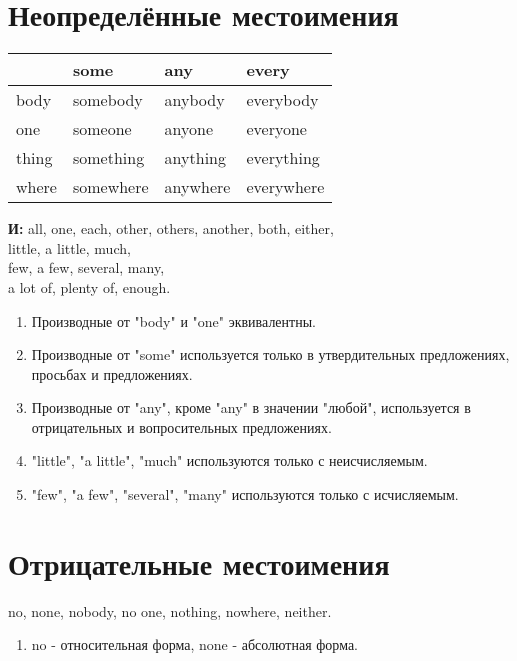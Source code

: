 \documentclass[oneside]{book}
\begin{document}
	\section{Неопределённые местоимения}
	\begin{center}
		\begin{tabular}{|l|l|l|l|}
		\hline
			  & some      & any      & every      \\ \hline
		body  & somebody  & anybody  & everybody  \\ \hline
		one   & someone   & anyone   & everyone   \\ \hline
		thing & something & anything & everything \\ \hline
		where & somewhere & anywhere & everywhere \\ \hline
		\end{tabular}
	\end{center}

	\textbf{И:} all, one, each, other, others, another,
	both, either,
	\\
	little, a little, much,
	\\
	few, a few, several, many,
	\\
	a lot of, plenty of, enough.

	\begin{enumerate}
		\item Производные от "body" и "one" эквивалентны.

		\item Производные от "some" используется только в
		утвердительных предложениях, просьбах и предложениях.

		\item Производные от "any"{}, кроме "any" в значении
		"любой"{}, используется в отрицательных
		и вопросительных предложениях.

		\item "little"{}, "a little"{}, "much" используются только
		с неисчисляемым.

		\item "few"{}, "a few"{}, "several"{}, "many" используются
		только с исчисляемым.
	\end{enumerate}

	\section{Отрицательные местоимения}
	no, none, nobody, no one, nothing, nowhere,
	neither.

	\begin{enumerate}
		\item no - относительная форма,
		none - абсолютная форма.
	\end{enumerate}
\end{document}
